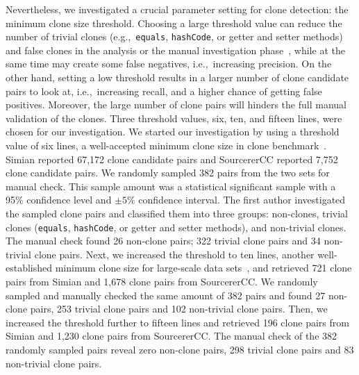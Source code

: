\documentclass[10pt,journal,compsoc]{IEEEtran}
\begin{document}
Nevertheless, we investigated a crucial parameter setting for clone detection: 
the minimum clone size threshold.
Choosing a large threshold value can reduce the number of trivial clones
(e.g.,~\texttt{equals}, \texttt{hashCode}, or getter and setter methods) and
false clones in the analysis or the manual investigation
phase~\cite{Sajnani2016}, while at the same time may create some false negatives,
i.e.,~increasing precision. On the other hand, setting a low threshold
results in a larger number of clone candidate pairs to look at, i.e.,~increasing recall, 
and a higher chance of getting false positives. 
Moreover, the large number of clone
pairs will hinders the full manual validation of the clones.
Three threshold values, six, ten, and fifteen lines, were chosen for our
investigation. We started our investigation by using a threshold value of six
lines, a well-accepted minimum clone size in clone benchmark~\cite{Bellon2007}.
Simian reported 67,172 clone candidate pairs and SourcererCC reported 7,752
clone candidate pairs. We randomly sampled 382 pairs from the two sets for
manual check. This sample amount was a statistical significant sample with a
95\% confidence level and $\pm 5\%$ confidence interval. The first author
investigated the sampled clone pairs and classified them into three groups:
non-clones, trivial clones (\texttt{equals}, \texttt{hashCode}, or getter and
setter methods), and non-trivial clones. The manual check found 26 non-clone
pairs; 322 trivial clone pairs and 34 non-trivial clone pairs. Next, we increased the
threshold to ten lines, another well-established minimum clone size for
large-scale data sets~\cite{Sajnani2016}, and retrieved 721 clone pairs from
Simian and 1,678 clone pairs from SourcererCC. We randomly sampled and manually
checked the same amount of 382 pairs and found 27 non-clone pairs, 253 trivial
clone pairs and 102 non-trivial clone pairs. Then, we increased the threshold
further to fifteen lines and retrieved 196 clone pairs from Simian and 1,230
clone pairs from SourcererCC. The manual check of the 382 randomly sampled pairs
reveal zero non-clone pairs, 298 trivial clone pairs and 83 non-trivial clone
pairs.
\end{document}
